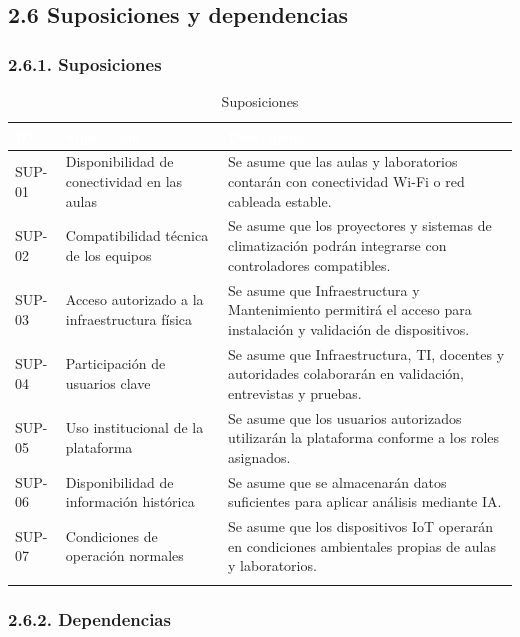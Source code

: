 \subsection*{2.6 Suposiciones y dependencias}


\subsubsection*{2.6.1. Suposiciones}


\begingroup
\small
\begin{longtable}{|P{0.3333}|P{0.3333}|P{0.3333}|}
\hline
{}\textcolor{white}{\textbf{ID}} & \textcolor{white}{\textbf{Suposición}} & \textcolor{white}{\textbf{Descripción}} \\ \hline
SUP-01 & Disponibilidad de conectividad en las aulas & Se asume que las aulas y laboratorios contarán con conectividad Wi-Fi o red cableada estable. \\ \hline
SUP-02 & Compatibilidad técnica de los equipos & Se asume que los proyectores y sistemas de climatización podrán integrarse con controladores compatibles. \\ \hline
SUP-03 & Acceso autorizado a la infraestructura física & Se asume que Infraestructura y Mantenimiento permitirá el acceso para instalación y validación de dispositivos. \\ \hline
SUP-04 & Participación de usuarios clave & Se asume que Infraestructura, TI, docentes y autoridades colaborarán en validación, entrevistas y pruebas. \\ \hline
SUP-05 & Uso institucional de la plataforma & Se asume que los usuarios autorizados utilizarán la plataforma conforme a los roles asignados. \\ \hline
SUP-06 & Disponibilidad de información histórica & Se asume que se almacenarán datos suficientes para aplicar análisis mediante IA. \\ \hline
SUP-07 & Condiciones de operación normales & Se asume que los dispositivos IoT operarán en condiciones ambientales propias de aulas y laboratorios. \\ \hline
\caption{Suposiciones}
\end{longtable}
\endgroup

\subsubsection*{2.6.2. Dependencias}

